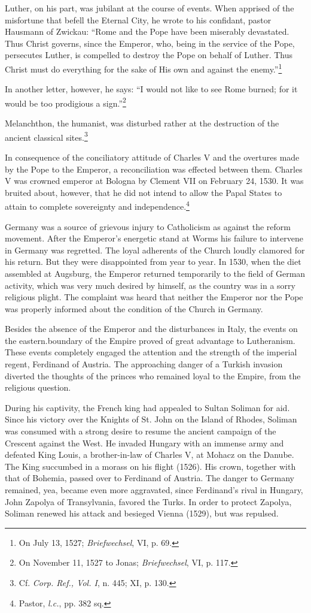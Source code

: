 Luther, on his part, was jubilant at the course of events. When
apprised of the misfortune that befell the Eternal City, he wrote to
his confidant, pastor Hausmann of Zwickau: “Rome and the Pope
have been miserably devastated. Thus Christ governs, since the Emperor,
who, being in the service of the Pope, persecutes Luther, is
compelled to destroy the Pope on behalf of Luther. Thus Christ must
do everything for the sake of His own and against the enemy.”\footnote{On July 13, 1527; \textit{Briefwechsel}, VI, p. 69.}

In another letter, however, he says: “I would not like to see Rome
burned; for it would be too prodigious a sign.”\footnote{On November 11, 1527 to Jonas; \textit{Briefwechsel}, VI, p. 117.}

Melanchthon, the
humanist, was disturbed rather at the destruction of the ancient
classical sites.\footnote{Cf. \textit{Corp. Ref., Vol. I}, n. 445; XI, p. 130.}


In consequence of the conciliatory attitude of Charles V and the
overtures made by the Pope to the Emperor, a reconciliation was effected
between them. Charles V was crowned emperor at Bologna
by Clement VII on February 24, 1530. It was bruited about, however,
that he did not intend to allow the Papal States to attain to complete
sovereignty and independence.\footnote{Pastor, \textit{l.c.}, pp. 382 sq.}

Germany was a source of grievous injury to Catholicism as against
the reform movement. After the Emperor’s energetic stand at Worms
his failure to intervene in Germany was regretted. The loyal adherents
of the Church loudly clamored for his return. But they were disappointed
from year to year. In 1530, when the diet assembled at
Augsburg, the Emperor returned temporarily to the field of German
activity, which was very much desired by himself, as the country was
in a sorry religious plight. The complaint was heard that neither the
Emperor nor the Pope was properly informed about the condition of
the Church in Germany.

Besides the absence of the Emperor and the disturbances in Italy,
the events on the eastern.boundary of the Empire proved of great advantage
to Lutheranism. These events completely engaged the attention and the
strength of the imperial regent, Ferdinand of Austria.
The approaching danger of a Turkish invasion diverted the thoughts
of the princes who remained loyal to the Empire, from the religious
question.

During his captivity, the French king had appealed to Sultan
Soliman for aid. Since his victory over the Knights of St. John on the
Island of Rhodes, Soliman was consumed with a strong desire to resume
the ancient campaign of the Crescent against the West. He invaded Hungary
with an immense army and defeated King Louis, a
brother-in-law of Charles V, at Mohacz on the Danube. The King
succumbed in a morass on his flight (1526). His crown, together
with that of Bohemia, passed over to Ferdinand of Austria. The danger
to Germany remained, yea, became even more aggravated, since
Ferdinand’s rival in Hungary, John Zapolya of Transylvania, favored
the Turks. In order to protect Zapolya, Soliman renewed his attack
and besieged Vienna (1529), but was repulsed.

